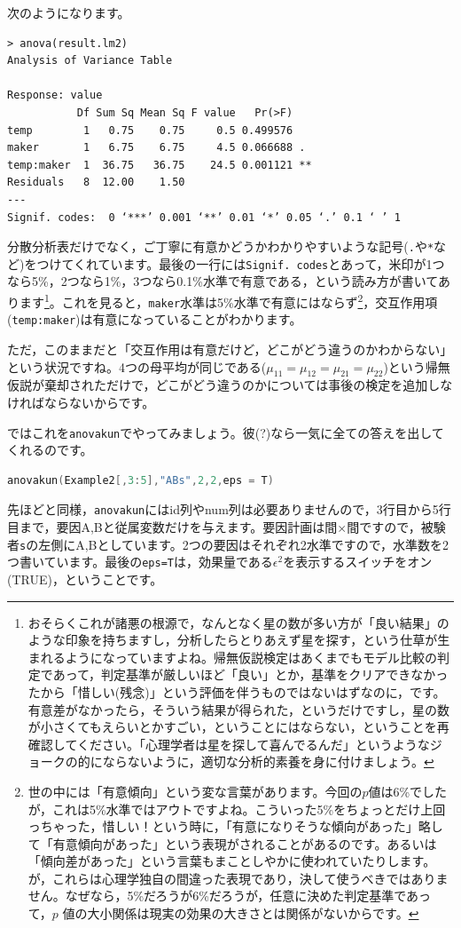 \documentclass{ltjsarticle}
\begin{document}
次のようになります。
\begin{tcolorbox}
\begin{verbatim}
> anova(result.lm2)
Analysis of Variance Table

Response: value
           Df Sum Sq Mean Sq F value   Pr(>F)   
temp        1   0.75    0.75     0.5 0.499576   
maker       1   6.75    6.75     4.5 0.066688 . 
temp:maker  1  36.75   36.75    24.5 0.001121 **
Residuals   8  12.00    1.50                    
---
Signif. codes:  0 ‘***’ 0.001 ‘**’ 0.01 ‘*’ 0.05 ‘.’ 0.1 ‘ ’ 1
\end{verbatim}
\end{tcolorbox}
分散分析表だけでなく，ご丁寧に有意かどうかわかりやすいような記号(\verb|.|や\verb|*|など)をつけてくれています。最後の一行には\texttt{Signif. codes}とあって，米印が1つなら5\%，2つなら1\%，3つなら0.1\%水準で有意である，という読み方が書いてあります\footnote{おそらくこれが諸悪の根源で，なんとなく星の数が多い方が「良い結果」のような印象を持ちますし，分析したらとりあえず星を探す，という仕草が生まれるようになっていますよね。帰無仮説検定はあくまでもモデル比較の判定であって，判定基準が厳しいほど「良い」とか，基準をクリアできなかったから「惜しい(残念)」という評価を伴うものではないはずなのに，です。有意差がなかったら，そういう結果が得られた，というだけですし，星の数が小さくてもえらいとかすごい，ということにはならない，ということを再確認してください。「心理学者は星を探して喜んでるんだ」というようなジョークの的にならないように，適切な分析的素養を身に付けましょう。}。これを見ると，\texttt{maker}水準は5\%水準で有意にはならず\footnote{世の中には「有意傾向」という変な言葉があります。今回の$p$値は6\%でしたが，これは5\%水準ではアウトですよね。こういった5\%をちょっとだけ上回っちゃった，惜しい！という時に，「有意になりそうな傾向があった」略して「有意傾向があった」という表現がされることがあるのです。あるいは「傾向差があった」という言葉もまことしやかに使われていたりします。が，これらは心理学独自の間違った表現であり，決して使うべきではありません。なぜなら，5\%だろうが6\%だろうが，任意に決めた判定基準であって，$p$ 値の大小関係は現実の効果の大きさとは関係がないからです。}，交互作用項(\texttt{temp:maker})は有意になっていることがわかります。

ただ，このままだと「交互作用は有意だけど，どこがどう違うのかわからない」という状況ですね。4つの母平均が同じである($\mu_{11}=\mu_{12}=\mu_{21}=\mu_{22}$)という帰無仮説が棄却されただけで，どこがどう違うのかについては事後の検定を追加しなければならないからです。

ではこれを\texttt{anovakun}でやってみましょう。彼(?)なら一気に全ての答えを出してくれるのです。
\begin{lstlisting}[language=c++]
anovakun(Example2[,3:5],"ABs",2,2,eps = T)
\end{lstlisting}
先ほどと同様，\texttt{anovakun}にはid列やnum列は必要ありませんので，3行目から5行目まで，要因A,Bと従属変数だけを与えます。要因計画は間$\times$間ですので，被験者\texttt{s}の左側にA,Bとしています。2つの要因はそれぞれ2水準ですので，水準数を2つ書いています。最後の\texttt{eps=T}は，効果量である$\epsilon^2$を表示するスイッチをオン(TRUE)，ということです。
\end{document}
